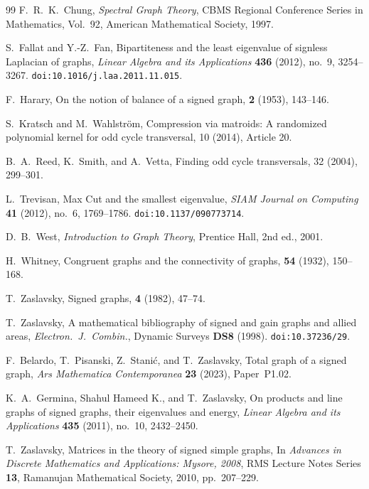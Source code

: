 \documentclass[11pt]{article}
\theoremstyle{plain}
\begin{document}
\begin{thebibliography}{99}
F.~R.~K.~Chung,
\newblock \emph{Spectral Graph Theory},
\newblock CBMS Regional Conference Series in Mathematics, Vol.~92,
American Mathematical Society, 1997.

S.~Fallat and Y.-Z.~Fan,
\newblock Bipartiteness and the least eigenvalue of signless Laplacian of graphs,
\newblock \emph{Linear Algebra and its Applications} \textbf{436} (2012), no.~9, 3254--3267.
\newblock \texttt{doi:10.1016/j.laa.2011.11.015}.

F.~Harary,
\newblock On the notion of balance of a signed graph,
 {\bf 2} (1953), 143--146.

S.~Kratsch and M.~Wahlstr\"om,
\newblock Compression via matroids: A randomized polynomial kernel for odd cycle transversal,
 10 (2014), Article 20.

B.~A.~Reed, K.~Smith, and A.~Vetta,
\newblock Finding odd cycle transversals,
 32 (2004), 299--301.

L.~Trevisan,
\newblock Max Cut and the smallest eigenvalue,
\newblock \emph{SIAM Journal on Computing} \textbf{41} (2012), no.~6, 1769--1786.
\newblock \texttt{doi:10.1137/090773714}.

D.~B.~West,
\newblock \emph{Introduction to Graph Theory},
\newblock Prentice Hall, 2nd ed., 2001.

H.~Whitney,
\newblock Congruent graphs and the connectivity of graphs,
 {\bf 54} (1932), 150--168.

T.~Zaslavsky,
\newblock Signed graphs,
 {\bf 4} (1982), 47--74.

T.~Zaslavsky,
\newblock A mathematical bibliography of signed and gain graphs and allied areas,
\newblock \emph{Electron.\ J.\ Combin.}, Dynamic Surveys \textbf{DS8} (1998).
\newblock \texttt{doi:10.37236/29}.

F.~Belardo, T.~Pisanski, Z.~Stani\'c, and T.~Zaslavsky,
\newblock Total graph of a signed graph,
\newblock \emph{Ars Mathematica Contemporanea} \textbf{23} (2023), Paper~P1.02.

K.~A.~Germina, Shahul Hameed K., and T.~Zaslavsky,
\newblock On products and line graphs of signed graphs, their eigenvalues and energy,
\newblock \emph{Linear Algebra and its Applications} \textbf{435} (2011), no.~10, 2432--2450.

T.~Zaslavsky,
\newblock Matrices in the theory of signed simple graphs,
\newblock In \emph{Advances in Discrete Mathematics and Applications: Mysore, 2008},
RMS Lecture Notes Series \textbf{13}, Ramanujan Mathematical Society, 2010, pp.~207--229.

\end{thebibliography}
\end{document}
